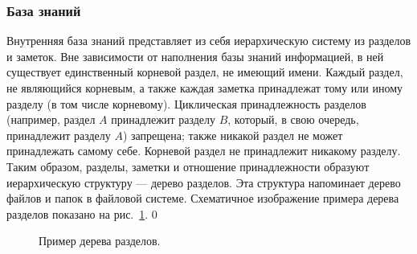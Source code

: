 \subsubsection{База знаний}
    \label{sec:req:fn:kb}
    Внутренняя база знаний представляет из себя иерархическую систему из разделов
    и заметок. Вне зависимости от наполнения базы знаний информацией, в ней существует единственный
    корневой раздел, не имеющий имени. Каждый раздел, не являющийся корневым, а также
    каждая заметка принадлежат тому или иному разделу (в том числе корневому). Циклическая
    принадлежность разделов (например, раздел \(A\) принадлежит разделу \(B\), который, в свою
    очередь, принадлежит разделу \(A\)) запрещена; также никакой раздел не может принадлежать самому
    себе. Корневой раздел не принадлежит никакому разделу. Таким образом, разделы, заметки и отношение
    принадлежности образуют иерархическую структуру --- дерево разделов. Эта структура напоминает
    дерево файлов и папок в файловой системе. Схематичное изображение примера дерева разделов
    показано на рис.~\ref{fig:req:fn:kb:tree}.
    \newlength{\treeindent}
    \newlength{\treeskip}
    \setlength{\treeindent}{2em}
    \setlength{\treeskip}{-3ex}
    \setcounter{treeline}0
    \newcommand{\mypoint}[2]{(#2 * \treeindent, #1 * \treeskip)}
    \newcommand{\outpoint}[2]{(#2 * \treeindent + 0.75em, #1 * \treeskip - 1.5ex)}
    \newcommand{\midpoint}[2]{(#2 * \treeindent + 0.75em, #1 * \treeskip)}
    \newcommand{\inpoint}[2]{(#2 * \treeindent - 0.1em, #1 * \treeskip)}
    \newcommand{\mynode}[2]{
        \node at \mypoint{\thetreeline}{#1} [anchor = west] {#2};%
        \stepcounter{treeline}%
    }
    \begin{figure}[h]
        \centering
        \caption{Пример дерева разделов.}
        \label{fig:req:fn:kb:tree}
    \end{figure}

